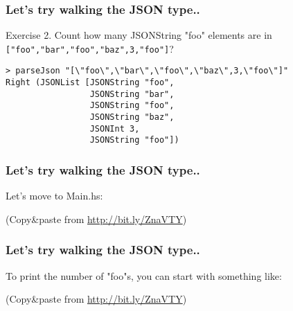 \documentclass{beamer}
\begin{document}
\begin{frame}[fragile]
\frametitle{Let's try walking the JSON type..}

Exercise 2. Count how many JSONString "foo" elements are in
\verb+["foo","bar","foo","baz",3,"foo"]+?

{\small
\begin{verbatim}
> parseJson "[\"foo\",\"bar\",\"foo\",\"baz\",3,\"foo\"]"
Right (JSONList [JSONString "foo",
                 JSONString "bar",
                 JSONString "foo",
                 JSONString "baz",
                 JSONInt 3,
                 JSONString "foo"])
\end{verbatim}
}

\end{frame}


\begin{frame}[fragile]
\frametitle{Let's try walking the JSON type..}

Let's move to Main.hs:

{\small

}

(Copy\&paste from \href{http://bit.ly/ZnaVTY}{http://bit.ly/ZnaVTY})
\end{frame}


\begin{frame}[fragile]
\frametitle{Let's try walking the JSON type..}

To print the number of "foo"s, you can start with something like:

{\small

}

(Copy\&paste from \href{http://bit.ly/ZnaVTY}{http://bit.ly/ZnaVTY})
\end{frame}


\end{document}
